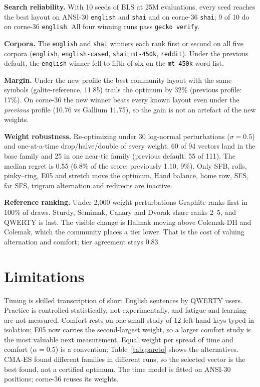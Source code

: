 \documentclass{gecko-paper}
\begin{document}
\begin{paperbody}
\textbf{Search reliability.} With 10 seeds of BLS at 25M evaluations, every seed reaches the best layout on ANSI-30 \texttt{english} and \texttt{shai} and on corne-36 \texttt{shai}; 9 of 10 do on corne-36 \texttt{english}. All four winning runs pass \texttt{gecko verify}.

\textbf{Corpora.} The \texttt{english} and \texttt{shai} winners each rank first or second on all five corpora (\texttt{english}, \texttt{english-cased}, \texttt{shai}, \texttt{mt-450k}, \texttt{reddit}). Under the previous default, the \texttt{english} winner fell to fifth of six on the \texttt{mt-450k} word list.

\textbf{Margin.} Under the new profile the best community layout with the same symbols (galite-reference, 11.85) trails the optimum by 32\% (previous profile: 17\%). On corne-36 the new winner beats every known layout even under the \emph{previous} profile (10.76 vs Gallium 11.75), so the gain is not an artefact of the new weights.

\textbf{Weight robustness.} Re-optimizing under 30 log-normal perturbations ($\sigma=0.5$) and one-at-a-time drop/halve/double of every weight, 60 of 94 vectors land in the base family and 25 in one near-tie family (previous default: 55 of 111). The median regret is 0.55 (6.8\% of the score; previously 1.10, 9\%). Only SFB, rolls, pinky–ring, E05 and stretch move the optimum. Hand balance, home row, SFS, far SFS, trigram alternation and redirects are inactive.

\textbf{Reference ranking.} Under 2{,}000 weight perturbations Graphite ranks first in 100\% of draws. Sturdy, Semimak, Canary and Dvorak share ranks 2–5, and QWERTY is last. The visible change is Halmak moving above Colemak-DH and Colemak, which the community places a tier lower. That is the cost of valuing alternation and comfort; tier agreement stays 0.83.

\section{Limitations}
Timing is skilled transcription of short English sentences by QWERTY users. Practice is controlled statistically, not experimentally, and fatigue and learning are not measured. Comfort rests on one small study of 12 left-hand keys typed in isolation; E05 now carries the second-largest weight, so a larger comfort study is the most valuable next measurement. Equal weight per spread of time and comfort ($\alpha=0.5$) is a convention; Table~\ref{tab:pareto} shows the alternatives. CMA-ES found different families in different runs, so the selected vector is the best found, not a certified optimum. The time model is fitted on ANSI-30 positions; corne-36 reuses its weights.


\end{paperbody}
\end{document}
